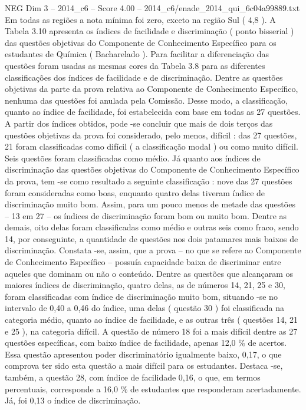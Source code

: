 \begin{textsample}{NEG Dim 3 – 2014\_c6 – Score 4.00 – 2014\_c6/enade\_2014\_qui\_6c04a99889.txt}
Em todas as regiões a nota mínima foi zero, exceto na região Sul ( 4,8 ).
A Tabela 3.10 apresenta os índices de facilidade e discriminação ( ponto bisserial ) das questões objetivas do Componente de Conhecimento Específico para os estudantes de Química ( Bacharelado ).
Para facilitar a diferenciação das questões foram usadas as mesmas cores da Tabela 3.8 para as diferentes classificações dos índices de facilidade e de discriminação.
Dentre as questões objetivas da parte da prova relativa ao Componente de Conhecimento Específico, nenhuma das questões foi anulada pela Comissão.
Desse modo, a classificação, quanto ao índice de facilidade, foi estabelecida com base em todas as 27 questões.
A partir dos índices obtidos, pode -se concluir que mais de dois terços das questões objetivas da prova foi considerado, pelo menos, difícil : das 27 questões, 21 foram classificadas como difícil ( a classificação modal ) ou como muito difícil.
Seis questões foram classificadas como médio.
Já quanto aos índices de discriminação das questões objetivas do Componente de Conhecimento Específico da prova, tem -se como resultado a seguinte classificação : nove das 27 questões foram consideradas como boas, enquanto quatro delas tiveram índice de discriminação muito bom.
Assim, para um pouco menos de metade das questões – 13 em 27 – os índices de discriminação foram bom ou muito bom.
Dentre as demais, oito delas foram classificadas como médio e outras seis como fraco, sendo 14, por conseguinte, a quantidade de questões nos dois patamares mais baixos de discriminação.
Constata -se, assim, que a prova – no que se refere ao Componente de Conhecimento Específico – possuía capacidade baixa de discriminar entre aqueles que dominam ou não o conteúdo.
Dentre as questões que alcançaram os maiores índices de discriminação, quatro delas, as de números 14, 21, 25 e 30, foram classificadas com índice de discriminação muito bom, situando -se no intervalo de 0,40 a 0,46 do índice, uma delas ( questão 30 ) foi classificada na categoria médio, quanto ao índice de facilidade, e as outras três ( questões 14, 21 e 25 ), na categoria difícil.
A questão de número 18 foi a mais difícil dentre as 27 questões específicas, com baixo índice de facilidade, apenas 12,0 \% de acertos.
Essa questão apresentou poder discriminatório igualmente baixo, 0,17, o que comprova ter sido esta questão a mais difícil para os estudantes.
Destaca -se, também, a questão 28, com índice de facilidade 0,16, o que, em termos percentuais, corresponde a 16,0 \% de estudantes que responderam acertadamente.
Já, foi 0,13 o índice de discriminação.

\end{textsample}
